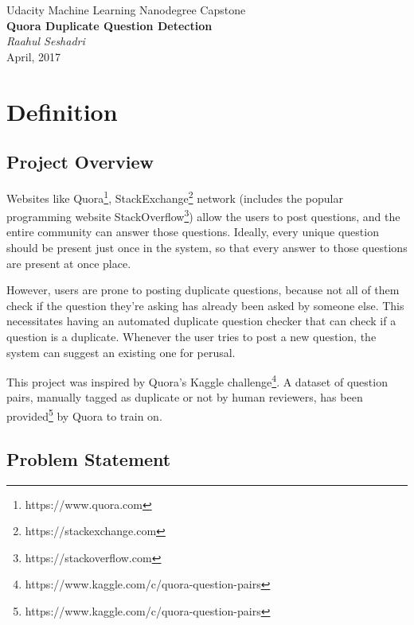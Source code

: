 \documentclass{article}
\begin{document}
\begin{titlepage}
    \begin{center}
        \Large{Udacity Machine Learning Nanodegree Capstone}\\
        \LARGE\textbf{Quora Duplicate Question Detection}\\
        \vspace{1cm}
        \large\textit{Raahul Seshadri}\\
        \normalsize{April, 2017}
    \end{center}
\end{titlepage}

\tableofcontents
\newpage

\section{Definition}

\subsection{Project Overview}
Websites like Quora\footnote{https://www.quora.com}, StackExchange\footnote{https://stackexchange.com} network (includes the popular programming website StackOverflow\footnote{https://stackoverflow.com}) allow the users to post questions, and the entire community can answer those questions. Ideally, every unique question should be present just once in the system, so that every answer to those questions are present at once place.

However, users are prone to posting duplicate questions, because not all of them check if the question they're asking has already been asked by someone else. This necessitates having an automated duplicate question checker that can check if a question is a duplicate. Whenever the user tries to post a new question, the system can suggest an existing one for perusal.

This project was inspired by Quora's Kaggle challenge\footnote{https://www.kaggle.com/c/quora-question-pairs}. A dataset of question pairs, manually tagged as duplicate or not by human reviewers, has been provided\footnote{https://www.kaggle.com/c/quora-question-pairs} by Quora to train on.

\subsection{Problem Statement}
\end{document}
